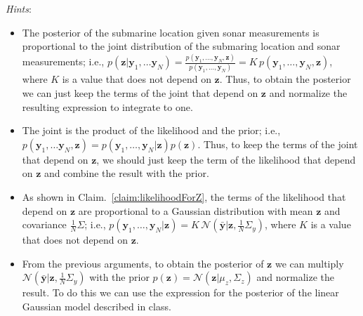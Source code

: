 \documentclass[12pt]{article}
\begin{document}
\begin{enumerate}[(a)]
        \textit{Hints}: 

        \begin{itemize}

            \item The posterior of the submarine location given sonar
                measurements is proportional to the joint distribution of
                the submaring location and sonar measurements; i.e.,
                $p(\mathbf{z}|\mathbf{y}_1,\ldots\mathbf{y}_N)=\frac{p(\mathbf{y}_1,\ldots,\mathbf{y}_N,\mathbf{z})}{p(\mathbf{y}_1,\ldots,\mathbf{y}_N)}=K\,p(\mathbf{y}_1,\ldots,\mathbf{y}_N,\mathbf{z})$,
                where $K$ is a value that does not depend on $\mathbf{z}$. Thus, to
                obtain the posterior we can just keep the terms of the
                joint that depend on $\mathbf{z}$ and normalize the
                resulting expression to integrate to one.

            \item The joint is the product of the likelihood and the prior;
                i.e.,
                $p(\mathbf{y}_1,\ldots\mathbf{y}_N,\mathbf{z})=p(\mathbf{y}_1,\ldots,\mathbf{y}_N|\mathbf{z})p(\mathbf{z})$.
                Thus, to keep the terms of the joint that depend on
                $\mathbf{z}$, we should just keep the term of the
                likelihood that depend on $\mathbf{z}$ and combine the
                result with the prior.

            \item As shown in Claim.~\ref{claim:likelihoodForZ}, the terms of the
                likelihood that depend on $\mathbf{z}$ are proportional to
                a Gaussian distribution with mean $\mathbf{z}$ and
                covariance $\frac{1}{N}\Sigma$; i.e., 
                $p(\mathbf{y}_1,\ldots,\mathbf{y}_N|\mathbf{z})=K\,\mathcal{N}(\bar{\mathbf{y}}|\mathbf{z},\frac{1}{N}\Sigma_y)$,
                where $K$ is a value that does not depend on $\mathbf{z}$.

            \item From the previous arguments, to obtain the posterior of
                $\mathbf{z}$ we can multiply
                $\mathcal{N}(\bar{\mathbf{y}}|\mathbf{z},\frac{1}{N}\Sigma_y)$
                with the prior
                $p(\mathbf{z})=\mathcal{N}(\mathbf{z}|\mu_z,\Sigma_z)$ and
                normalize the result. To do this we can use the expression
                for the posterior of the linear Gaussian model described in
                class.


\end{itemize}
\end{enumerate}
\end{document}
